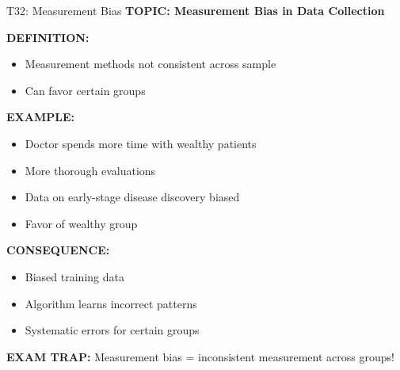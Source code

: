 \documentclass[8pt]{beamer}
\begin{document}
	\begin{frame}{T32: Measurement Bias}
		\fontsize{6.5}{7.5}\selectfont
		\textbf{TOPIC: Measurement Bias in Data Collection}
		
		\vspace{0.1cm}
		\textbf{DEFINITION:}
		\begin{itemize}
			\item Measurement methods not consistent across sample
			\item Can favor certain groups
		\end{itemize}
		
		\vspace{0.1cm}
		\textbf{EXAMPLE:}
		\begin{itemize}
			\item Doctor spends more time with wealthy patients
			\item More thorough evaluations
			\item Data on early-stage disease discovery biased
			\item Favor of wealthy group
		\end{itemize}
		
		\vspace{0.1cm}
		\textbf{CONSEQUENCE:}
		\begin{itemize}
			\item Biased training data
			\item Algorithm learns incorrect patterns
			\item Systematic errors for certain groups
		\end{itemize}
		
		\textcolor{myred}{\textbf{EXAM TRAP:}} Measurement bias = \textcolor{myblue}{inconsistent measurement across groups}!
	\end{frame}
	
\end{document}
